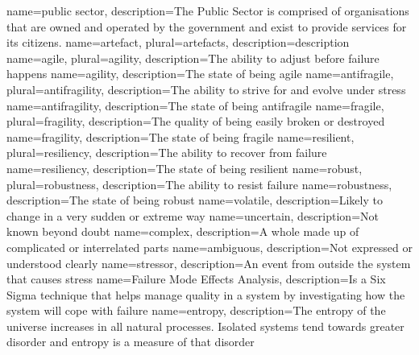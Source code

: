 {
	name={public sector},
	description={The Public Sector is comprised of organisations that are owned and operated by the government and exist to provide services for its citizens.}
}
{
	name={artefact},
	plural={artefacts},
	description={description}
}
{
	name=agile,
	plural={agility},
	description={The ability to adjust before failure happens}
}
{
	name={agility},
	description={The state of being agile}
}
{
	name=antifragile,
	plural={antifragility},
	description={The ability to strive for and evolve under stress}
}
{
	name={antifragility},
	description={The state of being antifragile}
}
{
	name=fragile,
	plural={fragility},
	description={The quality of being easily broken or destroyed}
}
{
	name={fragility},
	description={The state of being fragile}
}
{
	name=resilient,
	plural={resiliency},
	description={The ability to recover from failure}
}
{
	name={resiliency},
	description={The state of being resilient}
}
{
	name=robust,
	plural={robustness},
	description={The ability to resist failure}
}
{
	name={robustness},
	description={The state of being robust}
}
{
	name=volatile,
	description={Likely to change in a very sudden or extreme way}
}
{
	name=uncertain,
	description={Not known beyond doubt}
}
{
	name=complex,
	description={A whole made up of complicated or interrelated parts}
}
{
	name=ambiguous,
	description={Not expressed or understood clearly}
}
{
	name={stressor},
	description={An event from outside the system that causes stress}
}
{
	name={Failure Mode Effects Analysis},
	description={Is a Six Sigma technique that helps manage quality in a system by investigating how the system will cope with failure}
}
{
	name={entropy},
	description={The entropy of the universe increases in all natural processes. Isolated systems tend towards greater disorder and entropy is a measure of that disorder}
}
